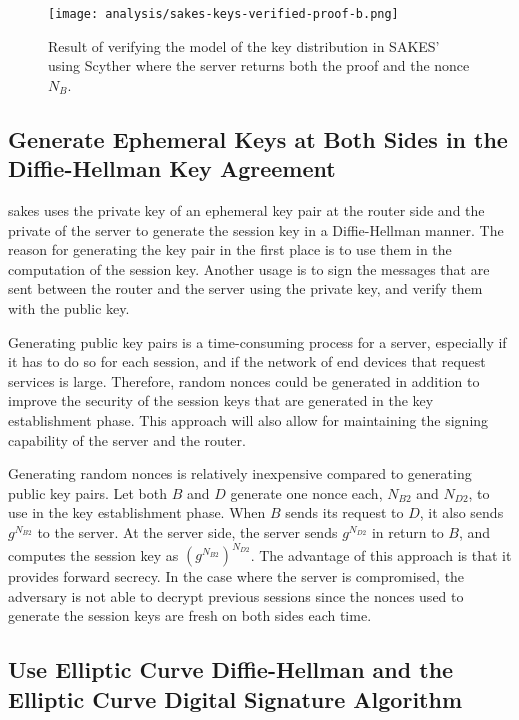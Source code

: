 \begin{figure}[H]
	\centering
	\texttt{[image: analysis/sakes-keys-verified-proof-b.png]}
	\caption{Result of verifying the model of the key distribution in SAKES' using Scyther where the server returns both the proof and the nonce $N_B$.}
	\label{fig:sakes-fix-verified-keys-b-proof}
\end{figure}

\subsection{Generate Ephemeral Keys at Both Sides in the Diffie-Hellman Key Agreement}

\gls{sakes} uses the private key of an ephemeral key pair at the router side and the private of the server to generate the session key in a Diffie-Hellman manner. The reason for generating the key pair in the first place is to use them in the computation of the session key. Another usage is to sign the messages that are sent between the router and the server using the private key, and verify them with the public key.

Generating public key pairs is a time-consuming process for a server, especially if it has to do so for each session, and if the network of end devices that request services is large. Therefore, random nonces could be generated in addition to improve the security of the session keys that are generated in the key establishment phase. This approach will also allow for maintaining the signing capability of the server and the router.

Generating random nonces is relatively inexpensive compared to generating public key pairs. Let both $B$ and $D$ generate one nonce each, $N_{B2}$ and $N_{D2}$, to use in the key establishment phase. When $B$ sends its request to $D$, it also sends $g^{N_{B2}}$ to the server. At the server side, the server sends $g^{N_{D2}}$ in return to $B$, and computes the session key as $(g^{N_{B2}})^{N_{D2}}$. The advantage of this approach is that it provides forward secrecy. In the case where the server is compromised, the adversary is not able to decrypt previous sessions since the nonces used to generate the session keys are fresh on both sides each time.


\subsection{Use Elliptic Curve Diffie-Hellman and the Elliptic Curve Digital Signature Algorithm}

